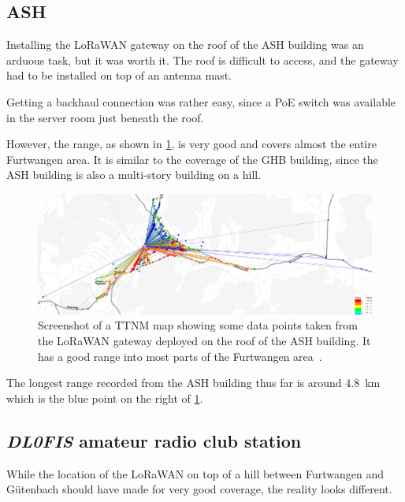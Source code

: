 \subsection{\acf{ASH}}

Installing the \ac{LoRaWAN} gateway on the roof of the \ac{ASH} building was an arduous task, but it was worth it.
The roof is difficult to access, and the gateway had to be installed on top of an antenna mast.

Getting a backhaul connection was rather easy, since a \ac{PoE} switch was available in the server room just beneath the roof.

However, the range, as shown in \cref{pic:ash_gw_range}, is very good and covers almost the entire Furtwangen area.
It is similar to the coverage of the \ac{GHB} building, since the \ac{ASH} building is also a multi-story building on a hill.

\begin{figure}[htbp]
    \centering
    \includegraphics[width=1\textwidth]{pictures/ttn-mapper/gateway-ranges/ash_gw_range.jpg}
    \caption{
        Screenshot of a \ac{TTNM} map showing some data points taken from the \ac{LoRaWAN} gateway deployed on the roof of the \ac{ASH} building.
        It has a good range into most parts of the Furtwangen area~\cite{ttn_mapper_ttn_2023}.
    }\label{pic:ash_gw_range}
\end{figure}

The longest range recorded from the \ac{ASH} building thus far is around \SI{4.8}{\kilo\meter} which is the blue point on the right of \cref{pic:ash_gw_range}.

\subsection{\emph{DL0FIS} amateur radio club station}

While the location of the \ac{LoRaWAN} on top of a hill between Furtwangen and Gütenbach should have made for very good coverage, the reality looks different.


